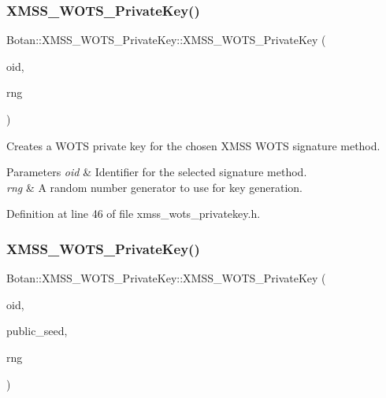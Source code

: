 \subsubsection{\texorpdfstring{X\+M\+S\+S\+\_\+\+W\+O\+T\+S\+\_\+\+Private\+Key()}{XMSS\_WOTS\_PrivateKey()}\hspace{0.1cm}{\footnotesize\ttfamily [2/5]}}
{\footnotesize\ttfamily Botan\+::\+X\+M\+S\+S\+\_\+\+W\+O\+T\+S\+\_\+\+Private\+Key\+::\+X\+M\+S\+S\+\_\+\+W\+O\+T\+S\+\_\+\+Private\+Key (\begin{DoxyParamCaption}\item[{X\+M\+S\+S\+\_\+\+W\+O\+T\+S\+\_\+\+Parameters\+::ots\+\_\+algorithm\+\_\+t}]{oid,  }\item[{Random\+Number\+Generator \&}]{rng }\end{DoxyParamCaption})\hspace{0.3cm}{\ttfamily [inline]}}

Creates a W\+O\+TS private key for the chosen X\+M\+SS W\+O\+TS signature method.


\begin{DoxyParams}{Parameters}
{\em oid} & Identifier for the selected signature method. \\
\hline
{\em rng} & A random number generator to use for key generation. \\
\hline
\end{DoxyParams}


Definition at line 46 of file xmss\+\_\+wots\+\_\+privatekey.\+h.

\mbox{\label{class_botan_1_1_x_m_s_s___w_o_t_s___private_key_af1f9f24679ab1138032165f56cf3e9cd}} 
\subsubsection{\texorpdfstring{X\+M\+S\+S\+\_\+\+W\+O\+T\+S\+\_\+\+Private\+Key()}{XMSS\_WOTS\_PrivateKey()}\hspace{0.1cm}{\footnotesize\ttfamily [3/5]}}
{\footnotesize\ttfamily Botan\+::\+X\+M\+S\+S\+\_\+\+W\+O\+T\+S\+\_\+\+Private\+Key\+::\+X\+M\+S\+S\+\_\+\+W\+O\+T\+S\+\_\+\+Private\+Key (\begin{DoxyParamCaption}\item[{X\+M\+S\+S\+\_\+\+W\+O\+T\+S\+\_\+\+Parameters\+::ots\+\_\+algorithm\+\_\+t}]{oid,  }\item[{const secure\+\_\+vector$<$ uint8\+\_\+t $>$ \&}]{public\+\_\+seed,  }\item[{Random\+Number\+Generator \&}]{rng }\end{DoxyParamCaption})\hspace{0.3cm}{\ttfamily [inline]}}

